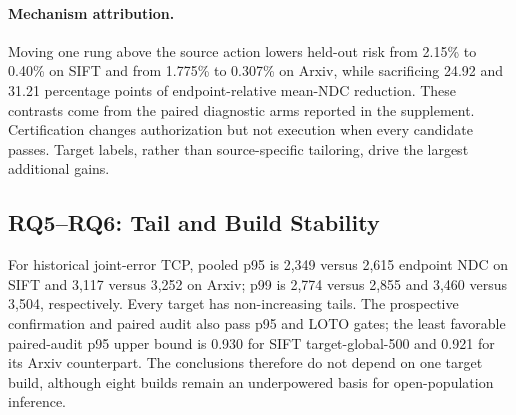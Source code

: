 \paragraph{Mechanism attribution.}
Moving one rung above the source action lowers held-out risk from 2.15\% to 0.40\% on SIFT and from 1.775\% to 0.307\% on Arxiv, while sacrificing 24.92 and 31.21 percentage points of endpoint-relative mean-NDC reduction. These contrasts come from the paired diagnostic arms reported in the supplement. Certification changes authorization but not execution when every candidate passes. Target labels, rather than source-specific tailoring, drive the largest additional gains.

\subsection{RQ5--RQ6: Tail and Build Stability}
For historical joint-error TCP, pooled p95 is 2,349 versus 2,615 endpoint NDC on SIFT and 3,117 versus 3,252 on Arxiv; p99 is 2,774 versus 2,855 and 3,460 versus 3,504, respectively. Every target has non-increasing tails. The prospective confirmation and paired audit also pass p95 and LOTO gates; the least favorable paired-audit p95 upper bound is 0.930 for SIFT target-global-500 and 0.921 for its Arxiv counterpart. The conclusions therefore do not depend on one target build, although eight builds remain an underpowered basis for open-population inference.
